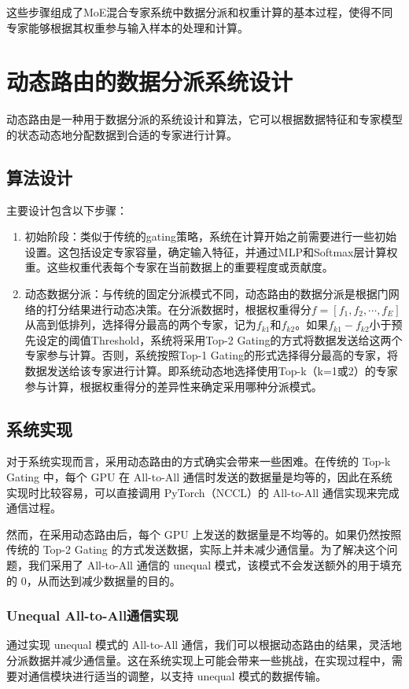 这些步骤组成了MoE混合专家系统中数据分派和权重计算的基本过程，使得不同专家能够根据其权重参与输入样本的处理和计算。

\section{动态路由的数据分派系统设计}

动态路由是一种用于数据分派的系统设计和算法，它可以根据数据特征和专家模型的状态动态地分配数据到合适的专家进行计算。

\subsection{算法设计}
主要设计包含以下步骤：
\begin{enumerate}
    \item 初始阶段：类似于传统的gating策略，系统在计算开始之前需要进行一些初始设置。这包括设定专家容量，确定输入特征，并通过MLP和Softmax层计算权重。这些权重代表每个专家在当前数据上的重要程度或贡献度。
    \item 动态数据分派：与传统的固定分派模式不同，动态路由的数据分派是根据门网络的打分结果进行动态决策。在分派数据时，根据权重得分$f=[f_1, f_2, \cdots, f_E]$从高到低排列，选择得分最高的两个专家，记为$f_{k1}$和$f_{k2}$。如果$f_{k1} - f_{k2}$小于预先设定的阈值Threshold，系统将采用Top-2 Gating的方式将数据发送给这两个专家参与计算。否则，系统按照Top-1 Gating的形式选择得分最高的专家，将数据发送给该专家进行计算。即系统动态地选择使用Top-k（k=1或2）的专家参与计算，根据权重得分的差异性来确定采用哪种分派模式。
\end{enumerate}

\subsection{系统实现}

对于系统实现而言，采用动态路由的方式确实会带来一些困难。在传统的 Top-k Gating 中，每个 GPU 在 All-to-All 通信时发送的数据量是均等的，因此在系统实现时比较容易，可以直接调用 PyTorch（NCCL）的 All-to-All 通信实现来完成通信过程。

然而，在采用动态路由后，每个 GPU 上发送的数据量是不均等的。如果仍然按照传统的 Top-2 Gating 的方式发送数据，实际上并未减少通信量。为了解决这个问题，我们采用了 All-to-All 通信的 unequal 模式，该模式不会发送额外的用于填充的 0，从而达到减少数据量的目的。


\subsubsection{Unequal All-to-All通信实现}
通过实现 unequal 模式的 All-to-All 通信，我们可以根据动态路由的结果，灵活地分派数据并减少通信量。这在系统实现上可能会带来一些挑战，在实现过程中，需要对通信模块进行适当的调整，以支持 unequal 模式的数据传输。


